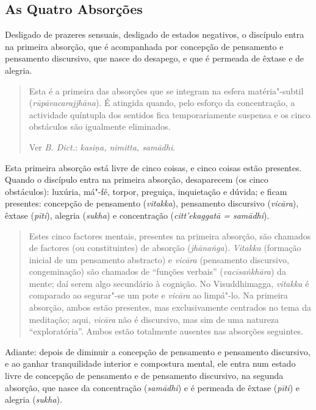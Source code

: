 \subsection{As Quatro Absorções}


Desligado de prazeres sensuais, desligado de estados negativos, o discípulo
entra na primeira absorção, que é acompanhada por concepção de pensamento e
pensamento discursivo, que nasce do desapego, e que é permeada de êxtase e de
alegria.


\begin{quote}
  Esta é a primeira das absorções que se integram na esfera matéria"-subtil
  (\emph{rūpāvacarajjhāna}). É atingida quando, pelo esforço da concentração, a
  actividade quíntupla dos sentidos fica temporariamente suspensa e os cinco
  obstáculos são igualmente eliminados.

  Ver \emph{B. Dict.}: \emph{kasi\d{n}a, nimitta, samādhi}.
\end{quote}

\clearpage

Esta primeira absorção está livre de cinco coisas, e cinco coisas estão
presentes. Quando o discípulo entra na primeira absorção, desaparecem (os
cinco obstáculos): luxúria, má"-fé, torpor, preguiça, inquietação e dúvida; e
ficam presentes: concepção de pensamento (\emph{vitakka}), pensamento discursivo
(\emph{vicāra}), êxtase (\emph{pīti}), alegria (\emph{sukha}) e concentração
(\emph{citt'ekaggatā = samādhi}).


\begin{quote}
  Estes cinco factores mentais, presentes na primeira absorção, são chamados de
  factores (ou constituintes) de absorção (\emph{jhāna\.{n}ga}). \emph{Vitakka}
  (formação inicial de um pensamento abstracto) e \emph{vicāra} (pensamento
  discursivo, congeminação) são chamados de “funções verbais”
  (\emph{vacīsa\.{n}khāra}) da mente; daí serem algo secundário à cognição.
  No Visuddhimagga, \emph{vitakka} é comparado ao segurar"-se um pote
  e \emph{vicāra} ao limpá"-lo. Na primeira absorção, ambos estão presentes, mas
  exclusivamente centrados no tema da meditação; aqui, \emph{vicāra} não é
  discursivo, mas sim de uma natureza “exploratória”. Ambos estão totalmente
  ausentes nas absorções seguintes.
\end{quote}

Adiante: depois de diminuir a concepção de pensamento e pensamento discursivo, e
ao ganhar tranquilidade interior e compostura mental, ele entra num estado livre
de concepção de pensamento e de pensamento discursivo, na segunda absorção, que
nasce da concentração (\emph{samādhi}) e é permeada de êxtase (\emph{pīti})
e alegria (\emph{sukha}).

